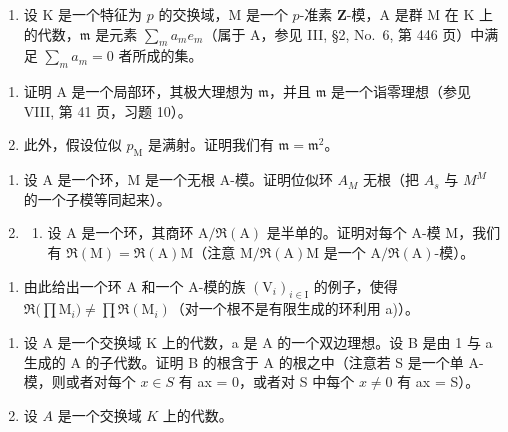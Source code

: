 
\begin{enumerate}
\def\labelenumi{\arabic{enumi})}
\tightlist
\item
  设 \(\mathrm{K}\) 是一个特征为 \(p\) 的交换域，\(\mathrm{M}\) 是一个 \(p\)-准素 \(\mathbf{Z}\)-模，\(\mathrm{A}\) 是群 \(\mathrm{M}\) 在 \(\mathrm{K}\) 上的代数，\(\mathfrak{m}\) 是元素 \(\sum_{m} a_{m} e_{m}\)（属于 \(\mathrm{A}\)，参见 III, §2, No.~6, 第 446 页）中满足 \(\sum_{m} a_{m} = 0\) 者所成的集。
\end{enumerate}

\begin{enumerate}
\def\labelenumi{\alph{enumi})}
\item
  证明 A 是一个局部环，其极大理想为 \(\mathfrak{m}\)，并且 \(\mathfrak{m}\) 是一个诣零理想（参见 VIII, 第 41 页，习题 10）。
\item
  此外，假设位似 \(p_{\mathrm{M}}\) 是满射。证明我们有 \(\mathfrak{m} = \mathfrak{m}^2\)。
\end{enumerate}

\begin{enumerate}
\def\labelenumi{\arabic{enumi})}
\setcounter{enumi}{1}
\item
  设 A 是一个环，M 是一个无根 A-模。证明位似环 \(A_{M}\) 无根（把 \(A_{s}\) 与 \(M^{M}\) 的一个子模等同起来）。
\item
  \begin{enumerate}
  \def\labelenumii{\alph{enumii})}
  \tightlist
  \item
    设 A 是一个环，其商环 \(\mathrm{A} / \Re (\mathrm{A})\) 是半单的。证明对每个 A-模 M，我们有 \(\Re (\mathrm{M}) = \Re (\mathrm{A})\mathrm{M}\)（注意 \(\mathrm{M} / \Re (\mathrm{A})\mathrm{M}\) 是一个 \(\mathrm{A} / \Re (\mathrm{A})\)-模）。
  \end{enumerate}
\end{enumerate}

\begin{enumerate}
\def\labelenumi{\alph{enumi})}
\setcounter{enumi}{1}
\tightlist
\item
  由此给出一个环 A 和一个 A-模的族 \((\mathrm{V}_{i})_{i\in\mathrm{I}}\) 的例子，使得 \(\Re\big(\prod\mathrm{M}_{i}\big)\neq\prod\Re(\mathrm{M}_{i})\)（对一个根不是有限生成的环利用 a)）。
\end{enumerate}

\begin{enumerate}
\def\labelenumi{\arabic{enumi})}
\setcounter{enumi}{3}
\item
  设 A 是一个交换域 K 上的代数，a 是 A 的一个双边理想。设 B 是由 1 与 a 生成的 A 的子代数。证明 B 的根含于 A 的根之中（注意若 S 是一个单 A-模，则或者对每个 \(x \in S\) 有 ax = 0，或者对 S 中每个 \(x \neq 0\) 有 ax = S）。
\item
  设 \(A\) 是一个交换域 \(K\) 上的代数。
\end{enumerate}

